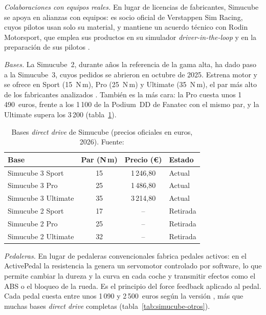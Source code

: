 \textit{Colaboraciones con equipos reales.} En lugar de licencias de fabricantes, Simucube se apoya en alianzas con equipos: es socio oficial de Verstappen Sim Racing, cuyos pilotos usan solo su material, y mantiene un acuerdo técnico con Rodin Motorsport, que emplea sus productos en su simulador \textit{driver-in-the-loop} y en la preparación de sus pilotos \parencite{simucube_web}.

\textit{Bases.} La Simucube~2, durante años la referencia de la gama alta, ha dado paso a la Simucube~3, cuyos pedidos se abrieron en octubre de 2025. Estrena motor y se ofrece en Sport (15~N\,m), Pro (25~N\,m) y Ultimate (35~N\,m), el par más alto de los fabricantes analizados \parencite{simucube_web}. También es la más cara: la Pro cuesta unos 1\,490~euros, frente a los 1\,100 de la Podium~DD de Fanatec con el mismo par, y la Ultimate supera los 3\,200 (tabla~\ref{tab:simucube}).

\begin{table}[htbp]
	\centering
	\caption[Bases \textit{direct drive} de Simucube (precios oficiales en euros, 2026)]{Bases \textit{direct drive} de Simucube (precios oficiales en euros, 2026). Fuente: \parencite{simucube_web}}
	\label{tab:simucube}
	\small
	\begin{tabular}{|l|c|c|l|}
		\hline
		\textbf{Base} & \textbf{Par (N\,m)} & \textbf{Precio (\euro)} & \textbf{Estado} \\
		\hline
		Simucube 3 Sport    & 15 & 1\,246,80 & Actual \\
		Simucube 3 Pro      & 25 & 1\,486,80 & Actual \\
		Simucube 3 Ultimate & 35 & 3\,214,80 & Actual \\
		Simucube 2 Sport    & 17 & --        & Retirada \\
		Simucube 2 Pro      & 25 & --        & Retirada \\
		Simucube 2 Ultimate & 32 & --        & Retirada \\
		\hline
	\end{tabular}
\end{table}

\textit{Pedaleras.} En lugar de pedaleras convencionales fabrica pedales activos: en el ActivePedal la resistencia la genera un servomotor controlado por software, lo que permite cambiar la dureza y la curva en cada coche y transmitir efectos como el ABS o el bloqueo de la rueda. Es el principio del force feedback aplicado al pedal. Cada pedal cuesta entre unos 1\,090 y 2\,500~euros según la versión \parencite{simucube_web}, más que muchas bases \textit{direct drive} completas (tabla~\ref{tab:simucube-otros}).

